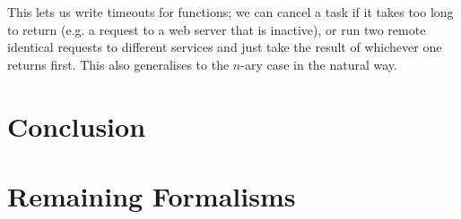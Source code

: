 \documentclass[msc,deptreport,cs]{infthesis} %
\begin{document}
This lets us write timeouts for functions; we can cancel a task if it takes too
long to return (e.g. a request to a web server that is inactive), or run two
remote identical requests to different services and just take the result of
whichever one returns first. This also generalises to the $n$-ary case in the
natural way.



\chapter{Conclusion}
\label{chap:conclusion}








\appendix

\chapter{Remaining Formalisms}
\end{document}
